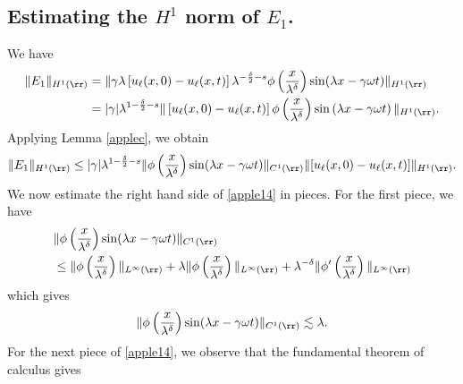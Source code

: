 \subsection{Estimating the $H^1$ norm of $\hyperref[all_errors_together]{E_1}$.} We have
\begin{equation*}
	\begin{split}
		\|E_1\|_{H^1(\rr)}
		& = \| \gamma \lambda \left[ u_\ell(x,0) - u_\ell(x,t) \right]
		\lambda^{-\frac{\delta}{2}-s} \phi\left( \frac{x}{\lambda^\delta}
		\right ) \sin (\lambda x - \gamma \omega t )\|_{H^1(\rr)}
		\\
		& = |\gamma| \lambda^{1 -\frac{\delta}{2} -s } \|\left[ u_\ell(x,0) - u_\ell(x,t)
		\right] \phi\left( \frac{x}{\lambda^\delta} \right )
		\sin\left( \lambda x - \gamma \omega t
		\right) \|_{H^1(\rr)}.
	\end{split}
\end{equation*}
Applying Lemma \ref{applec}, we obtain
\begin{equation}
	\begin{split}
		\|E_1\|_{H^1(\rr)} \le |\gamma| \lambda^{1 - \frac{\delta}{2} -s } \|\phi
		\left( \frac{x}{\lambda^\delta} \right) \sin (\lambda x - \gamma \omega t)
		\|_{C^1(\rr)} \|[u_\ell (x,0) - u_\ell (x,t) ] \|_{H^1(\rr)}.
		\label{apple14}
	\end{split}
\end{equation}
We now estimate the right hand side of \eqref{apple14} in pieces. For the first piece, we
have
\begin{equation*}
	\begin{split}
		& \|\phi \left( \frac{x}{\lambda^\delta} \right) \sin (\lambda x - \gamma \omega t)
		\|_{C^1(\rr)} 
		\\
		&
		\le \|\phi \left( \frac{x}{\lambda^\delta} \right) \|_{L^\infty(\rr)} + \lambda
		\|\phi\left( \frac{x}{\lambda^\delta} \right)\|_{L^\infty(\rr)} +
		\lambda^{-\delta} \|\phi'\left( \frac{x}{\lambda^\delta}
		\right)\|_{L^\infty(\rr)}
	\end{split}
\end{equation*}
which gives
\begin{equation}
	\begin{split}
		\|\phi\left( \frac{x}{\lambda^\delta} \right) \sin(\lambda x - \gamma \omega t)
		\|_{C^1(\rr)}
		\lesssim \lambda.
		\label{apple15}
	\end{split}
\end{equation}
For the next piece of \eqref{apple14}, we observe that the fundamental theorem
of calculus gives

